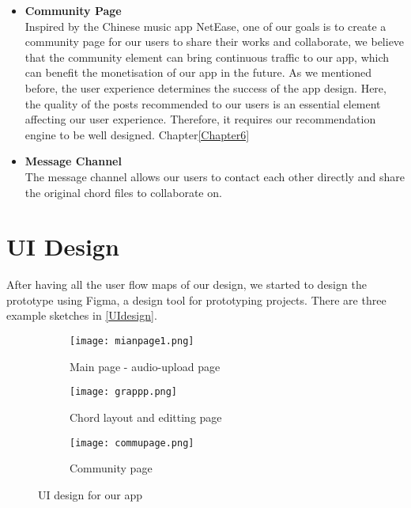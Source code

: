 \begin{itemize}
\item \textbf{Community Page}
\\Inspired by the Chinese music app NetEase, one of our goals is to create a community page for our users to share their works and collaborate, 
we believe that the community element can bring continuous traffic to our app, which can benefit the monetisation of our app in the future.
As we mentioned before, the user experience determines the success of the app design. Here, the quality of the posts recommended to our users is an essential element affecting our user experience. 
Therefore, it requires our recommendation engine to be well designed. Chapter\ref{Chapter6}

\item \textbf{Message Channel}
\\The message channel allows our users to contact each other directly and share the original chord files to collaborate on.

\end{itemize}




\section{UI Design}
After having all the user flow maps of our design, we started to design the prototype using Figma, a design tool for prototyping projects. 
There are three example sketches in \autoref{UIdesign}. 

\begin{figure}[ht]
    \label{UIdesign}
     \centering
     \hspace{16mm}
     \begin{subfigure}[b]{0.2\textwidth}
         \centering
         \texttt{[image: mianpage1.png]}
         \caption{Main page - audio-upload page}
         \label{Mainpage}
     \end{subfigure}
     \hfill
     \begin{subfigure}[b]{0.2\textwidth}
         \centering
         \texttt{[image: grappp.png]}
         \caption{Chord layout and editting page}
         \label{chordedit}
     \end{subfigure}
     \hfill
     \begin{subfigure}[b]{0.2\textwidth}
         \centering
         \texttt{[image: commupage.png]}
         \caption{Community page}
         \label{Community page}
     \end{subfigure}
     \hspace{16mm}
        \caption{UI design for our app}
        \label{fig:three graphs}
\end{figure}

